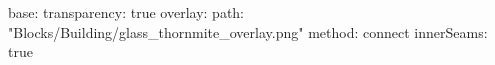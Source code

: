 base:
  transparency: true
overlay:
  path: "Blocks/Building/glass_thornmite_overlay.png"
  method: connect
  innerSeams: true